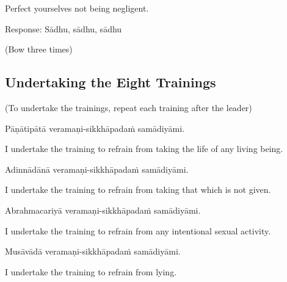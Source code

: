 \begin{english}
Perfect yourselves not being negligent.\\
\end{english}

Response: Sādhu, sādhu, sādhu\\

\begin{center}
(Bow three times)\\
\end{center}

\subsection*{Undertaking the Eight Trainings}

\begin{center}
(To undertake the trainings, repeat each training after the leader)\\
\end{center}

Pāṇātipātā veramaṇi-sikkhāpadaṁ samādiyāmi.\\

\begin{english}
I undertake the training to refrain from taking the life of any living being.\\
\end{english}

Adinnādānā veramaṇi-sikkhāpadaṁ samādiyāmi.\\

\begin{english}
I undertake the training to refrain from taking that which is not given.\\
\end{english}

Abrahmacariyā veramaṇi-sikkhāpadaṁ samādiyāmi.\\

\begin{english}
I undertake the training to refrain from any intentional sexual activity.\\
\end{english}

Musāvādā veramaṇi-sikkhāpadaṁ samādiyāmi.\\

\begin{english}
I undertake the training to refrain from lying.\\
\end{english}

